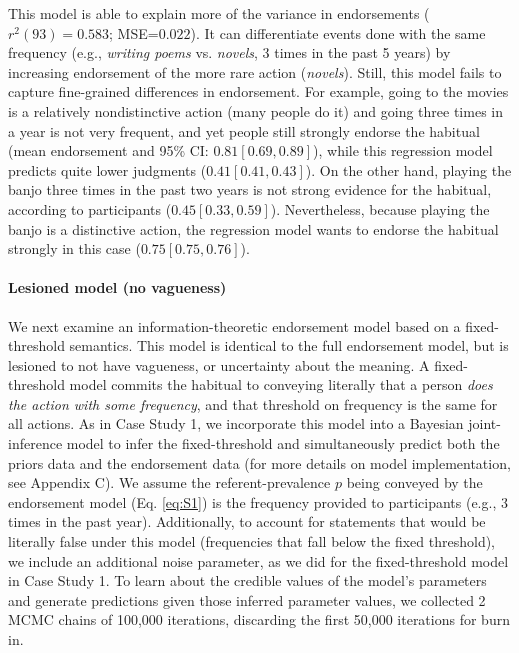 \documentclass[english,,man,floatsintext]{apa6}
\let\oldparagraph\paragraph
\renewcommand{\paragraph}[1]{\oldparagraph{#1}\mbox{}}
\theoremstyle{definition}
\theoremstyle{definition}
\theoremstyle{definition}
\theoremstyle{remark}
\begin{document}
This model is able to explain more of the variance in endorsements
(\(r^2(93) = 0.583\); MSE=\(0.022\)). It can differentiate events done
with the same frequency (e.g., \emph{writing poems} vs. \emph{novels}, 3
times in the past 5 years) by increasing endorsement of the more rare
action (\emph{novels}). Still, this model fails to capture fine-grained
differences in endorsement. For example, going to the movies is a
relatively nondistinctive action (many people do it) and going three
times in a year is not very frequent, and yet people still strongly
endorse the habitual (mean endorsement and 95\% CI:
\(0.81 [0.69, 0.89]\)), while this regression model predicts quite lower
judgments (\(0.41 [0.41, 0.43]\)). On the other hand, playing the banjo
three times in the past two years is not strong evidence for the
habitual, according to participants (\(0.45 [0.33, 0.59]\)).
Nevertheless, because playing the banjo is a distinctive action, the
regression model wants to endorse the habitual strongly in this case
(\(0.75 [0.75, 0.76]\)).

\hypertarget{lesioned-model-no-vagueness-1}{%
\paragraph{Lesioned model (no
vagueness)}\label{lesioned-model-no-vagueness-1}}

We next examine an information-theoretic endorsement model based on a
fixed-threshold semantics. This model is identical to the full
endorsement model, but is lesioned to not have vagueness, or uncertainty
about the meaning. A fixed-threshold model commits the habitual to
conveying literally that a person \emph{does the action with some
frequency}, and that threshold on frequency is the same for all actions.
As in Case Study 1, we incorporate this model into a Bayesian
joint-inference model to infer the fixed-threshold and simultaneously
predict both the priors data and the endorsement data (for more details
on model implementation, see Appendix C). We assume the
referent-prevalence \(p\) being conveyed by the endorsement model (Eq.
\ref{eq:S1}) is the frequency provided to participants (e.g., 3 times in
the past year). Additionally, to account for statements that would be
literally false under this model (frequencies that fall below the fixed
threshold), we include an additional noise parameter, as we did for the
fixed-threshold model in Case Study 1. To learn about the credible
values of the model's parameters and generate predictions given those
inferred parameter values, we collected 2 MCMC chains of 100,000
iterations, discarding the first 50,000 iterations for burn in.
\end{document}
